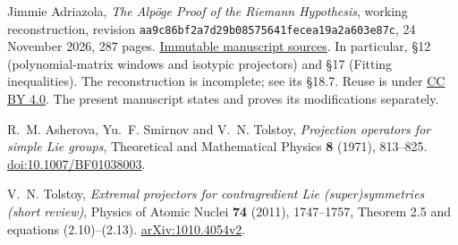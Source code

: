 Jimmie Adriazola, \emph{The Alp\"oge Proof of the Riemann Hypothesis},
working reconstruction, revision
\texttt{aa9c86bf2a7d29b08575641fecea19a2a603e87c},
24 November 2026, 287 pages.
\href{https://github.com/jimjamzola/RH-Alpoge-Reconstruction/tree/aa9c86bf2a7d29b08575641fecea19a2a603e87c/manuscript}{Immutable manuscript sources}.
In particular, \S12 (polynomial-matrix windows and isotypic projectors)
and \S17 (Fitting inequalities). The reconstruction is incomplete;
see its \S18.7. Reuse is under
\href{https://creativecommons.org/licenses/by/4.0/}{CC BY 4.0}. The present manuscript
states and proves its modifications separately.

R.~M. Asherova, Yu.~F. Smirnov and V.~N. Tolstoy,
\emph{Projection operators for simple Lie groups},
Theoretical and Mathematical Physics \textbf{8} (1971), 813--825.
\href{https://doi.org/10.1007/BF01038003}{doi:10.1007/BF01038003}.

V.~N. Tolstoy,
\emph{Extremal projectors for contragredient Lie (super)symmetries
(short review)}, Physics of Atomic Nuclei \textbf{74} (2011),
1747--1757, Theorem 2.5 and equations (2.10)--(2.13).
\href{https://arxiv.org/abs/1010.4054}{arXiv:1010.4054v2}.

